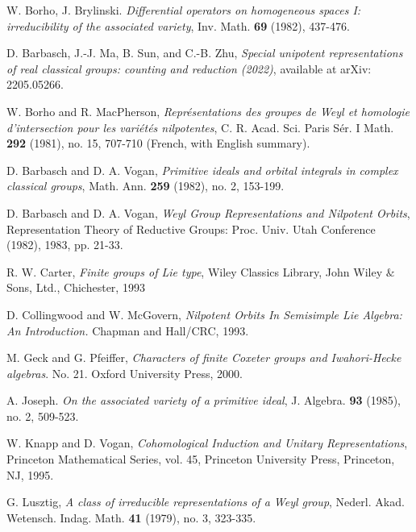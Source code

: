 \documentclass[12pt, a4paper]{amsart}
\numberwithin{equation}{section}
\begin{document}
\begin{thebibliography}{99}

    W. Borho, J. Brylinski. \textit{Differential operators on homogeneous spaces I: irreducibility of the associated variety}, Inv. Math. \textbf{69} (1982), 437-476. 


   D. Barbasch, J.-J. Ma, B. Sun, and C.-B. Zhu, \textit{Special unipotent representations of real classical groups: counting and reduction (2022)}, available at arXiv: 2205.05266.

    W. Borho and R. MacPherson, \textit{Repr\'esentations des groupes de Weyl et homologie d'intersection pour les vari\'et\'es nilpotentes}, C. R. Acad. Sci. Paris S\'er. I Math. \textbf{292} (1981), no. 15, 707-710 (French, with English summary).

   D. Barbasch and D. A. Vogan, \textit{Primitive ideals and orbital integrals in complex classical groups}, Math. Ann. \textbf{259} (1982), no. 2, 153-199.

    D. Barbasch and D. A. Vogan, \textit{Weyl Group Representations and Nilpotent Orbits}, Representation Theory of Reductive Groups: Proc. Univ. Utah Conference (1982), 1983, pp. 21-33.



    R. W. Carter, \textit{Finite groups of Lie type}, Wiley Classics Library, John Wiley $\&$ Sons, Ltd., Chichester, 1993

   D. Collingwood and W. McGovern, \textit{Nilpotent Orbits In Semisimple Lie Algebra: An Introduction.} Chapman and Hall/CRC, 1993.

    M. Geck and G. Pfeiffer, \textit{Characters of finite Coxeter groups and Iwahori-Hecke algebras}. No. 21. Oxford University Press, 2000.
    
    A. Joseph. \textit{On the associated variety of a primitive ideal}, J. Algebra. \textbf{93} (1985), no. 2, 509-523.

    W. Knapp and D. Vogan, \textit{Cohomological Induction and Unitary Representations}, Princeton Mathematical Series, vol. 45, Princeton University Press, Princeton, NJ, 1995.

    G. Lusztig, \textit{A class of irreducible representations of a Weyl group}, Nederl. Akad. Wetensch. Indag. Math. \textbf{41} (1979), no. 3, 323-335.


\end{thebibliography}
\end{document}
